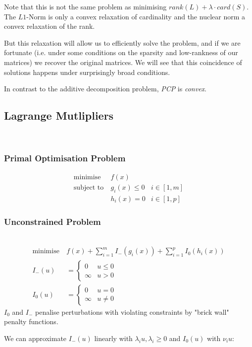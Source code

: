Note that this is not the same problem as minimising $rank(L) + \lambda\cdot card(S)$. The $L1$-Norm is only a convex relaxation of cardinality and the nuclear norm a convex relaxation of the rank.


But this relaxation will allow us to efficiently solve the problem, and if we are fortunate (i.e. under some conditions on the sparsity and low-rankness of our matrices) we recover the original matrices. We will see that this coincidence of solutions happens under surprisingly broad conditions.


In contrast to the additive decomposition problem, \emph{PCP} is \emph{convex}.

\subsection{Lagrange Mutlipliers} $\ $
\subsubsection{Primal Optimisation Problem}
\begin{align*}
    \text{minimise}\ &f(x)\\
    \text{subject to}\ &g_i(x)\leq 0&i\in[1,m]\\
     &h_i(x) =0 &i\in[1,p]
\end{align*}
\subsubsection{Unconstrained Problem} $\ $
\begin{align*}
    \text{minimise}\ &f(x) + \sum_{i=1}^m I_- (g_i(x)) + \sum_{i=1}^p I_0(h_i(x))\\
        I_-(u) &= \begin{cases}
                     0 &u\leq 0\\
                     \infty &u>0
                 \end{cases}\\
        I_0(u) &=
            \begin{cases}
                0 & u=0\\
                \infty &u\neq 0
            \end{cases}
\end{align*}
$I_0$ and $I_-$ penalise perturbations with violating constraints by "brick wall" penalty functions.

We can approximate $I_-(u)$ linearly with $\lambda_i u, \lambda_i \geq 0$ and $I_0(u)$ with $\nu_i u$:

